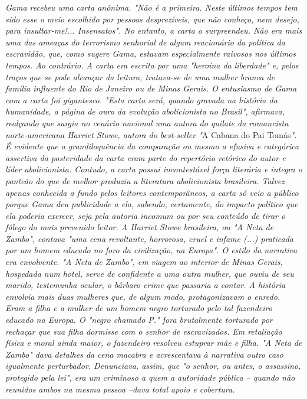 \emph{Gama recebeu uma carta anônima. "Não é a primeira. Neste últimos
tempos tem sido esse o meio escolhido por pessoas desprezíveis, que não
conheço, nem desejo, para insultar-me!... Insensatos". No entanto, a
carta o surpreendeu. Não era mais uma das ameaças do terrorismo
senhorial de algum reacionário da política da escravidão, que, como
sugere Gama, estavam especialmente raivosos nos últimos tempos. Ao
contrário. A carta era escrita por uma "heroína da liberdade" e, pelos
traços que se pode alcançar da leitura, tratava-se de uma mulher branca
de família influente do Rio de Janeiro ou de Minas Gerais. O entusiasmo
de Gama com a carta foi gigantesco. "Esta carta será, quando gravada na
história da humanidade, a página de ouro da evolução abolicionista no
Brasil", afirmava, realçando que surgia no cenário nacional uma autora
do quilate da romancista norte-americana Harriet Stowe, autora do
best-seller "}A Cabana do Pai Tomás\emph{". É evidente que a
grandiloquência da comparação ou mesmo a efusiva e categórica assertiva
da posteridade da carta eram parte do repertório retórico do autor e
líder abolicionista. Contudo, a carta possui incontestável força
literária e integra o panteão do que de melhor produziu a literatura
abolicionista brasileira. Talvez apenas conhecida a fundo pelos leitores
contemporâneos, a carta só veio a público porque Gama deu publicidade a
ela, sabendo, certamente, do impacto político que ela poderia exercer,
seja pela autoria incomum ou por seu conteúdo de tirar o fôlego do mais
prevenido leitor. A Harriet Stowe brasileira, ou "A Neta de Zambo",
contava "uma cena revoltante, horrorosa, cruel e infame (...) praticada
por um homem educado no foro da civilização, na Europa". O estilo da
narrativa era envolvente. "A Neta de Zambo", em viagem ao interior de
Minas Gerais, hospedada num hotel, serve de confidente a uma outra
mulher, que ouviu de seu marido, testemunha ocular, o bárbaro crime que
passaria a contar. A história envolvia mais duas mulheres que, de algum
modo, protagonizavam o enredo. Eram a filha e a mulher de um homem negro
torturado pelo tal fazendeiro educado na Europa. O "negro chamado P."
fora brutalmente torturado por rechaçar que sua filha dormisse com o
senhor de escravizados. Em retaliação física e moral ainda maior, o
fazendeiro resolveu estuprar mãe e filha. "A Neta de Zambo" dava
detalhes da cena macabra e acrescentava à narrativa outro caso
igualmente perturbador. Denunciava, assim, que "o senhor, ou antes, o
assassino, protegido pela lei", era um criminoso a quem a autoridade
pública -- quando não reunidos ambos na mesma pessoa --dava total apoio
e cobertura. }

